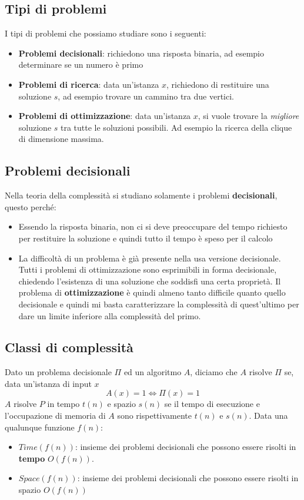 \subsection{Tipi di problemi}
I tipi di problemi che possiamo studiare sono i seguenti:
\begin{itemize}
	\item \textbf{Problemi decisionali}: richiedono una risposta binaria, ad esempio determinare se un numero è primo
	\item \textbf{Problemi di ricerca}: data un'istanza $x$, richiedono di restituire una soluzione $s$, ad esempio trovare un cammino tra due vertici.
	\item \textbf{Problemi di ottimizzazione}: data un'istanza $x$, si vuole trovare la \emph{migliore} soluzione $s$ tra tutte le soluzioni possibili. Ad esempio la ricerca della clique di dimensione massima.
\end{itemize}

\subsection{Problemi decisionali}
Nella teoria della complessità si studiano solamente i problemi \textbf{decisionali}, questo perché:
\begin{itemize}
	\item Essendo la risposta binaria, non ci si deve preoccupare del tempo richiesto per restituire la soluzione e quindi tutto il tempo è speso per il calcolo
	\item La difficoltà di un problema è già presente nella usa versione decisionale. 
	Tutti i problemi di ottimizzazione sono esprimibili in forma decisionale, chiedendo l'esistenza di una soluzione che soddisfi una certa proprietà. Il problema di \textbf{ottimizzazione} è quindi almeno tanto difficile quanto quello decisionale e quindi mi basta caratterizzare la complessità di quest'ultimo per dare un limite inferiore alla complessità del primo.
\end{itemize}

\subsection{Classi di complessità}
Dato un problema decisionale $\Pi$ ed un algoritmo $A$, diciamo che $A$ risolve $\Pi$ se, data un'istanza di input $x$
\begin{equation*}
	A(x) = 1 \Longleftrightarrow \Pi(x) = 1
\end{equation*}
$A$ risolve $P$ in tempo $t(n)$ e spazio $s(n)$ se il tempo di esecuzione e l’occupazione di memoria di $A$ sono rispettivamente $t(n)$ e $s(n)$.
Data una qualunque funzione $f(n)$:
\begin{itemize}
	\item $Time(f(n))$: insieme dei problemi decisionali che possono essere risolti in \textbf{tempo} $O(f(n))$.
	\item $Space(f(n))$: insieme dei problemi decisionali che possono essere risolti in spazio $O(f(n))$
\end{itemize}

